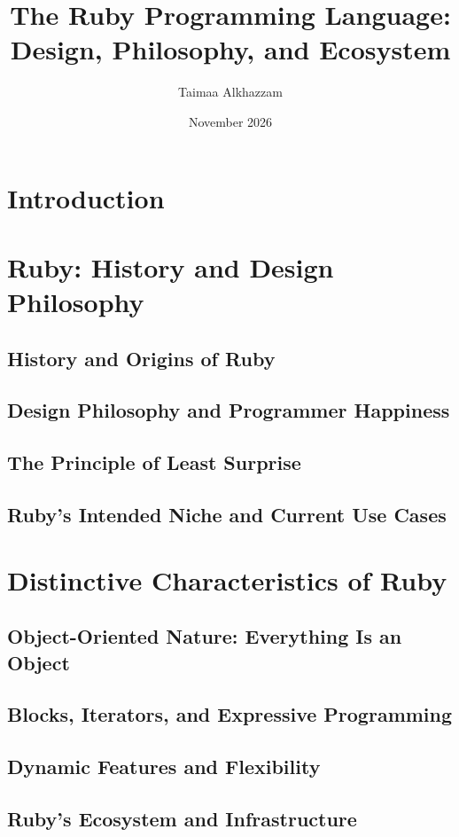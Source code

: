 \documentclass[12pt,a4paper]{article}
\title{The Ruby Programming Language: Design, Philosophy, and Ecosystem}
\author{Taimaa Alkhazzam}
\date{November 2026}
\begin{document}
\maketitle

\section{Introduction}

\section{Ruby: History and Design Philosophy}
\subsection{History and Origins of Ruby}
\subsection{Design Philosophy and Programmer Happiness}
\subsection{The Principle of Least Surprise}
\subsection{Ruby's Intended Niche and Current Use Cases}

\section{Distinctive Characteristics of Ruby}
\subsection{Object-Oriented Nature: Everything Is an Object}
\subsection{Blocks, Iterators, and Expressive Programming}
\subsection{Dynamic Features and Flexibility}
\subsection{Ruby's Ecosystem and Infrastructure}
\end{document}
